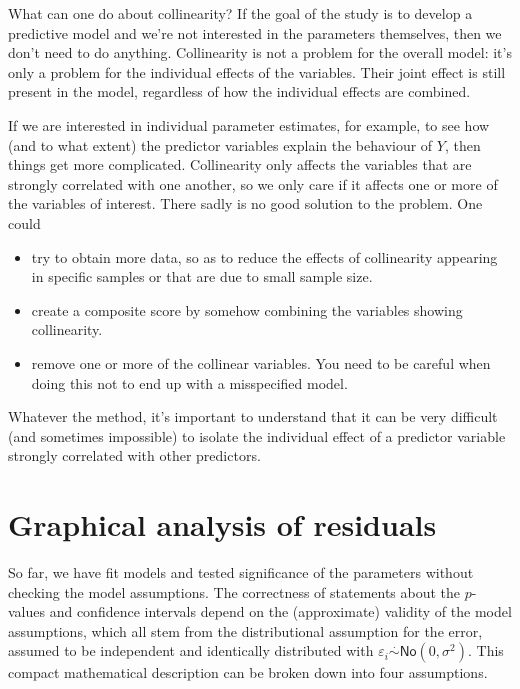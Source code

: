 \documentclass[
  11pt,
  letterpaper,
]{book}
\providecommand{\tightlist}{%
  \setlength{\itemsep}{0pt}\setlength{\parskip}{0pt}}
\theoremstyle{definition}
\theoremstyle{definition}
\theoremstyle{definition}
\theoremstyle{remark}
\begin{document}
What can one do about collinearity? If the goal of the study is to develop a predictive model and we're not interested in the parameters themselves, then we don't need to do anything. Collinearity is not a problem for the overall model: it's only a problem for the individual effects of the variables. Their joint effect is still present in the model, regardless of how the individual effects are combined.

If we are interested in individual parameter estimates, for example,
to see how (and to what extent) the predictor variables explain the behaviour of \(Y\), then things get more complicated. Collinearity only affects the variables that are strongly correlated with one another, so we only care if it affects one or more of the variables of interest. There sadly is no good solution to the problem. One could

\begin{itemize}
\tightlist
\item
  try to obtain more data, so as to reduce the effects of collinearity appearing in specific samples or that are due to small sample size.
\item
  create a composite score by somehow combining the variables showing collinearity.
\item
  remove one or more of the collinear variables. You need to be careful when doing this not to end up with a misspecified model.
\end{itemize}

Whatever the method, it's important to understand that it can be very difficult (and sometimes impossible) to isolate the individual effect of a predictor variable strongly correlated with other predictors.

\hypertarget{graphical-analysis-of-residuals}{%
\section{Graphical analysis of residuals}\label{graphical-analysis-of-residuals}}

So far, we have fit models and tested significance of the parameters without checking the model assumptions. The correctness of statements about the \(p\)-values and confidence intervals depend on the (approximate) validity of the model assumptions, which all stem from the distributional assumption for the error, assumed to be independent and identically distributed with \(\varepsilon_i \stackrel{\cdot}{\sim} \mathsf{No}(0, \sigma^2)\). This compact mathematical description can be broken down into four assumptions.
\end{document}
